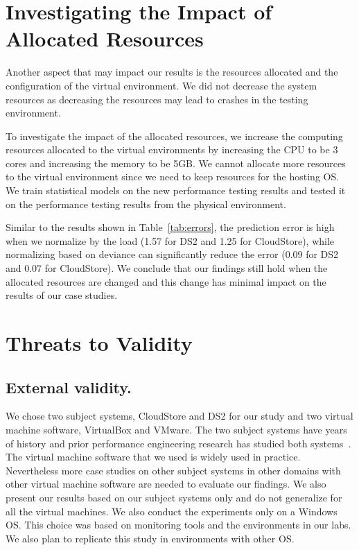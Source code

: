 	
\section{Investigating the Impact of Allocated Resources}

Another aspect that may impact our results is the resources allocated and the configuration of the virtual environment. We did not decrease the system resources as decreasing the resources may lead to crashes in the testing environment.

To investigate the impact of the allocated resources, we increase the computing resources allocated to the virtual environments by increasing the CPU to be 3 cores and increasing the memory to be 5GB. We cannot allocate more resources to the virtual environment since we need to keep resources for the hosting OS. We train statistical models on the new performance testing results and tested it on the performance testing results from the physical environment. 

Similar to the results shown in Table~\ref{tab:errors}, the prediction error is high when we normalize by the load (1.57 for DS2 and 1.25 for CloudStore), while normalizing based on deviance can significantly reduce the error (0.09 for DS2 and 0.07 for CloudStore). We conclude that our findings still hold when the allocated resources are changed and this change has minimal impact on the results of our case studies.

	
	\section{Threats to Validity}
	\label{sec:threats}
	
	
	\subsection{External validity.}
	We chose two subject systems, CloudStore and DS2 for our study and two virtual machine software, VirtualBox and VMware. The two subject systems have years of history and prior performance engineering research has studied both systems~\cite{jackicsm2009,Nguyen:2012:ADP:2188286.2188344,tarekmsr16}. The virtual machine software that we used is widely used in practice. Nevertheless more case studies on other subject systems in other domains with other virtual machine software are needed to evaluate our findings. We also present our results based on our subject systems only and do not generalize for all the virtual machines. We also conduct the experiments only on a Windows OS. This choice was based on monitoring tools and the environments in our labs. We also plan to replicate this study in environments with other OS.
	
